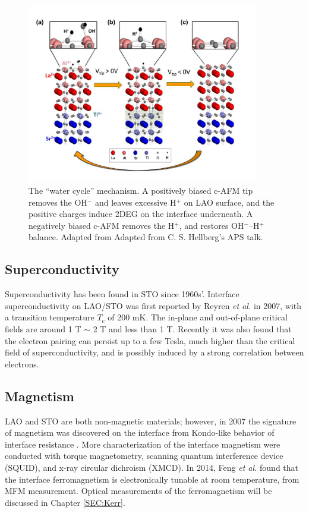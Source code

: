 \documentclass[pdflatex, sectionletters, 12pt]{pittetd}    %
\begin{document}
\begin{figure}[h!]
	\centering
	\includegraphics[width=0.9\textwidth]{Drawing/WaterCycle.png}
	\caption{The ``water cycle'' mechanism. A positively biased c-AFM tip removes the OH$^{-}$ and leaves excessive H$^{+}$ on LAO surface, and the positive charges induce 2DEG on the interface underneath. A negatively biased c-AFM removes the H$^{+}$, and restores OH$^{-}$--H$^{+}$ balance. Adapted from Adapted from C. S. Hellberg's APS talk.}
	\label{FIG:WaterCycle}
\end{figure}

\subsection{Superconductivity}

Superconductivity has been found in STO since 1960s'\cite{schooley1964superconductivity}. Interface superconductivity on LAO/STO was first reported by Reyren \textit{et al.} in 2007\cite{reyren2007superconducting}, with a transition temperature $T_c$ of 200 mK. The in-plane and out-of-plane critical fields are around 1 T $\sim$ 2 T and less than 1 T. Recently it was also found that the electron pairing can persist up to a few Tesla, much higher than the critical field of superconductivity, and is possibly induced by a strong correlation between electrons\cite{cheng2015electron, cheng2016tunable}.

\subsection{Magnetism}

LAO and STO are both non-magnetic materials; however, in 2007 the signature of magnetism was discovered on the interface from Kondo-like behavior of interface resistance \cite{brinkman2007magnetic}. More characterization of the interface magnetism were conducted with torque magnetometry\cite{li2011coexistence}, scanning quantum interference device (SQUID)\cite{bert2011direct}, and x-ray circular dichroism (XMCD)\cite{lee2013titanium}. In 2014, Feng \textit{et al.} found that the interface ferromagnetism is electronically tunable at room temperature, from MFM measurement\cite{bi2014room}. Optical measurements of the ferromagnetism will be discussed in Chapter \ref{SEC:Kerr}.
\end{document}
